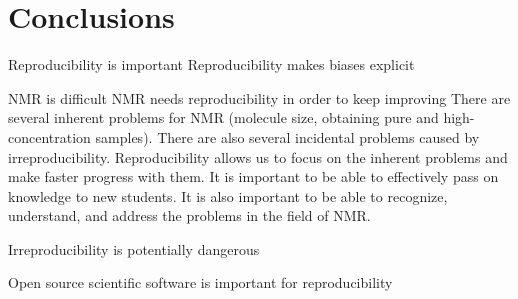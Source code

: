 \chapter{Conclusions}

Reproducibility is important
Reproducibility makes biases explicit

NMR is difficult
NMR needs reproducibility in order to keep improving
There are several inherent problems for NMR (molecule size, obtaining pure and high-concentration samples).
There are also several incidental problems caused by irreproducibility.
Reproducibility allows us to focus on the inherent problems and make faster progress with them.
It is important to be able to effectively pass on knowledge to new students.
It is also important to be able to recognize, understand, and address the problems in the field of NMR.

Irreproducibility is potentially dangerous

Open source scientific software is important for reproducibility
